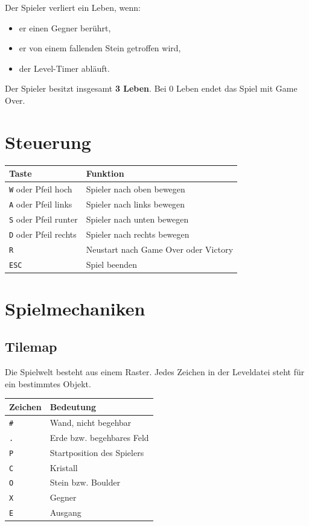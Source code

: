\documentclass[12pt,a4paper]{article}
\begin{document}
Der Spieler verliert ein Leben, wenn:

\begin{itemize}
    \item er einen Gegner berührt,
    \item er von einem fallenden Stein getroffen wird,
    \item der Level-Timer abläuft.
\end{itemize}

Der Spieler besitzt insgesamt \textbf{3 Leben}. Bei 0 Leben endet das Spiel mit Game Over.

\section{Steuerung}

\begin{longtable}{|p{5cm}|p{8cm}|}
\hline
\textbf{Taste} & \textbf{Funktion} \\
\hline
\texttt{W} oder Pfeil hoch & Spieler nach oben bewegen \\
\hline
\texttt{A} oder Pfeil links & Spieler nach links bewegen \\
\hline
\texttt{S} oder Pfeil runter & Spieler nach unten bewegen \\
\hline
\texttt{D} oder Pfeil rechts & Spieler nach rechts bewegen \\
\hline
\texttt{R} & Neustart nach Game Over oder Victory \\
\hline
\texttt{ESC} & Spiel beenden \\
\hline
\end{longtable}

\section{Spielmechaniken}

\subsection{Tilemap}

Die Spielwelt besteht aus einem Raster. Jedes Zeichen in der Leveldatei steht für ein bestimmtes Objekt.

\begin{longtable}{|p{3cm}|p{10cm}|}
\hline
\textbf{Zeichen} & \textbf{Bedeutung} \\
\hline
\texttt{\#} & Wand, nicht begehbar \\
\hline
\texttt{.} & Erde bzw. begehbares Feld \\
\hline
\texttt{P} & Startposition des Spielers \\
\hline
\texttt{C} & Kristall \\
\hline
\texttt{O} & Stein bzw. Boulder \\
\hline
\texttt{X} & Gegner \\
\hline
\texttt{E} & Ausgang \\
\hline
\end{longtable}
\end{document}
